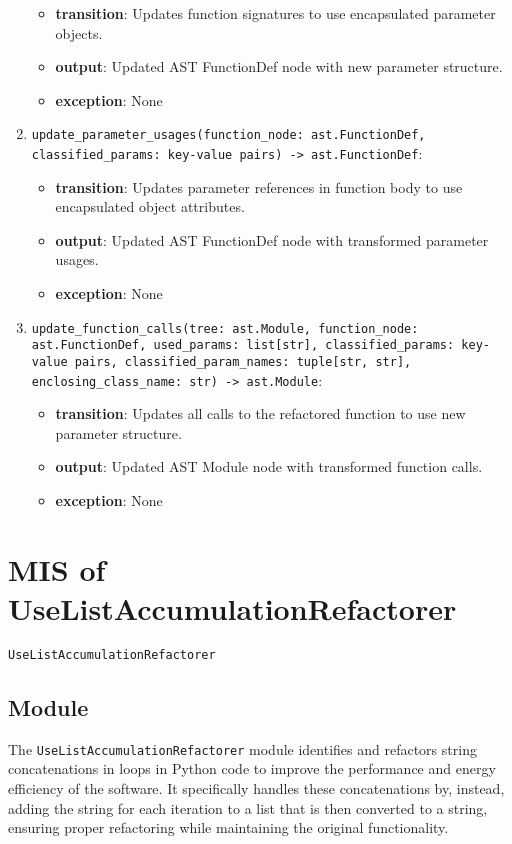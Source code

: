 \documentclass[12pt, titlepage]{article}
\begin{document}
\begin{enumerate}
  \begin{itemize}
    \item \textbf{transition}: Updates function signatures to use encapsulated parameter objects.
    \item \textbf{output}: Updated AST FunctionDef node with new parameter structure.
    \item \textbf{exception}: None
  \end{itemize}
  \item \texttt{update\_parameter\_usages(function\_node: ast.FunctionDef, classified\_params: key-value pairs) -> ast.FunctionDef}: 
  \begin{itemize}
    \item \textbf{transition}: Updates parameter references in function body to use encapsulated object attributes.
    \item \textbf{output}: Updated AST FunctionDef node with transformed parameter usages.
    \item \textbf{exception}: None
  \end{itemize}
  \item \texttt{update\_function\_calls(tree: ast.Module, function\_node: ast.FunctionDef, used\_params: list[str], classified\_params: key-value pairs, classified\_param\_names: tuple[str, str], enclosing\_class\_name: str) -> ast.Module}: 
  \begin{itemize}
    \item \textbf{transition}: Updates all calls to the refactored function to use new parameter structure.
    \item \textbf{output}: Updated AST Module node with transformed function calls.
    \item \textbf{exception}: None
  \end{itemize}
  \end{enumerate}

  \section{MIS of UseListAccumulationRefactorer} \label{mis:ListAccum}

  \texttt{UseListAccumulationRefactorer}
  
  \subsection{Module}
  
  The \texttt{UseListAccumulationRefactorer} module identifies and refactors 
  string concatenations in loops in Python code to improve the performance and energy efficiency of the software. It specifically handles these concatenations by, instead, adding the string for each iteration to a list that is then converted to a string, ensuring proper refactoring while maintaining the original functionality.
  
\end{document}
